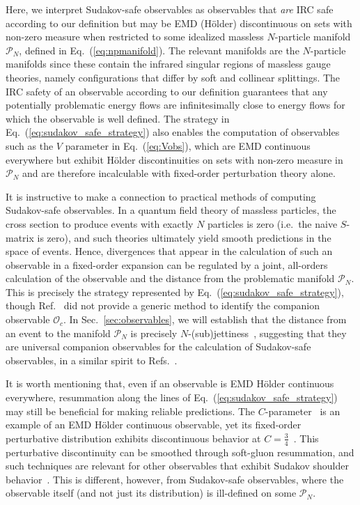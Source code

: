 \documentclass[letterpaper,11pt]{article}
\DeclareRobustCommand{\Sec}[1]{Sec.~\ref{#1}}
\DeclareRobustCommand{\Eq}[1]{Eq.~(\ref{#1})}
\DeclareRobustCommand{\Ref}[1]{Ref.~\cite{#1}}
\DeclareRobustCommand{\Refs}[1]{Refs.~\cite{#1}}
\begin{document}
Here, we interpret Sudakov-safe observables as observables that \emph{are} IRC safe according to our definition but may be EMD (H\"{o}lder) discontinuous on sets with non-zero measure when restricted to some idealized massless $N$-particle manifold $\mathcal P_N$, defined in \Eq{eq:npmanifold}.
%
The relevant manifolds are the $N$-particle manifolds since these contain the infrared singular regions of massless gauge theories, namely configurations that differ by soft and collinear splittings.
%
The IRC safety of an observable according to our definition guarantees that any potentially problematic energy flows are infinitesimally close to energy flows for which the observable is well defined.
%
The strategy in \Eq{eq:sudakov_safe_strategy} also enables the computation of observables such as the $V$ parameter in \Eq{eq:Vobs}, which are EMD continuous everywhere but exhibit H\"{o}lder discontinuities on sets with non-zero measure in $\mathcal P_N$ and are therefore incalculable with fixed-order perturbation theory alone.


It is instructive to make a connection to practical methods of computing Sudakov-safe observables.
%
In a quantum field theory of massless particles, the cross section to produce events with exactly $N$ particles is zero (i.e.~the naive $S$-matrix is zero), and such theories ultimately yield smooth predictions in the space of events.
%
Hence, divergences that appear in the calculation of such an observable in a fixed-order expansion can be regulated by a joint, all-orders calculation of the observable and the distance from the problematic manifold $\mathcal P_N$.
%
This is precisely the strategy represented by \Eq{eq:sudakov_safe_strategy}, though \Ref{Larkoski:2015lea} did not provide a generic method to identify the companion observable $\mathcal{O}_c$.
%
In \Sec{sec:observables}, we will establish that the distance from an event to the manifold $\mathcal P_N$ is precisely $N$-(sub)jettiness~\cite{Stewart:2010tn,Thaler:2010tr,Thaler:2011gf}, suggesting that they are universal companion observables for the calculation of Sudakov-safe observables, in a similar spirit to \Refs{Alioli:2012fc,Alioli:2013hqa,Alioli:2015toa}.


It is worth mentioning that, even if an observable is EMD H\"{o}lder continuous everywhere, resummation along the lines of \Eq{eq:sudakov_safe_strategy} may still be beneficial for making reliable predictions.
%
The $C$-parameter~\cite{Parisi:1978eg,Donoghue:1979vi,Ellis:1980wv} is an example of an EMD H\"{o}lder continuous observable, yet its fixed-order perturbative distribution exhibits discontinuous behavior at $C = \frac{3}{4}$~\cite{Catani:1997xc}.
%
This perturbative discontinuity can be smoothed through soft-gluon resummation, and such techniques are relevant for other observables that exhibit Sudakov shoulder behavior~\cite{Larkoski:2015uaa}.
%
This is different, however, from Sudakov-safe observables, where the observable itself (and not just its distribution) is ill-defined on some $\mathcal P_N$.
\end{document}
